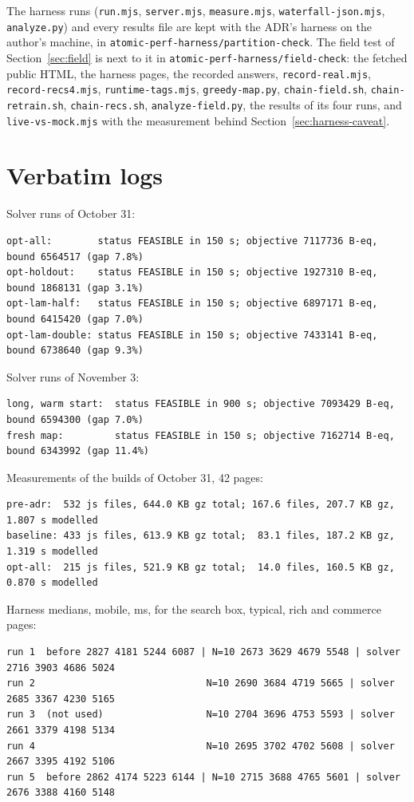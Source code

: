 \documentclass[11pt]{article}
\newcommand{\code}[1]{\texttt{#1}}
\begin{document}
\noindent The harness runs (\code{run.mjs}, \code{server.mjs}, \code{measure.mjs}, \code{waterfall-json.mjs}, \code{analyze.py}) and every results file are kept with the ADR's harness on the author's machine, in \code{atomic-perf-harness/partition-check}. The field test of Section~\ref{sec:field} is next to it in \code{atomic-perf-harness/field-check}: the fetched public HTML, the harness pages, the recorded answers, \code{record-real.mjs}, \code{record-recs4.mjs}, \code{runtime-tags.mjs}, \code{greedy-map.py}, \code{chain-field.sh}, \code{chain-retrain.sh}, \code{chain-recs.sh}, \code{analyze-field.py}, the results of its four runs, and \code{live-vs-mock.mjs} with the measurement behind Section~\ref{sec:harness-caveat}.

\section{Verbatim logs}\label{app:logs}
Solver runs of October 31:
\par{\footnotesize
\begin{verbatim}
opt-all:        status FEASIBLE in 150 s; objective 7117736 B-eq, bound 6564517 (gap 7.8%)
opt-holdout:    status FEASIBLE in 150 s; objective 1927310 B-eq, bound 1868131 (gap 3.1%)
opt-lam-half:   status FEASIBLE in 150 s; objective 6897171 B-eq, bound 6415420 (gap 7.0%)
opt-lam-double: status FEASIBLE in 150 s; objective 7433141 B-eq, bound 6738640 (gap 9.3%)
\end{verbatim}
}
\noindent Solver runs of November 3:
\par{\footnotesize
\begin{verbatim}
long, warm start:  status FEASIBLE in 900 s; objective 7093429 B-eq, bound 6594300 (gap 7.0%)
fresh map:         status FEASIBLE in 150 s; objective 7162714 B-eq, bound 6343992 (gap 11.4%)
\end{verbatim}
}
\noindent Measurements of the builds of October 31, 42 pages:
\par{\footnotesize
\begin{verbatim}
pre-adr:  532 js files, 644.0 KB gz total; 167.6 files, 207.7 KB gz, 1.807 s modelled
baseline: 433 js files, 613.9 KB gz total;  83.1 files, 187.2 KB gz, 1.319 s modelled
opt-all:  215 js files, 521.9 KB gz total;  14.0 files, 160.5 KB gz, 0.870 s modelled
\end{verbatim}
}
\noindent Harness medians, mobile, ms, for the search box, typical, rich and commerce pages:
\par{\footnotesize
\begin{verbatim}
run 1  before 2827 4181 5244 6087 | N=10 2673 3629 4679 5548 | solver 2716 3903 4686 5024
run 2                              N=10 2690 3684 4719 5665 | solver 2685 3367 4230 5165
run 3  (not used)                  N=10 2704 3696 4753 5593 | solver 2661 3379 4198 5134
run 4                              N=10 2695 3702 4702 5608 | solver 2667 3395 4192 5106
run 5  before 2862 4174 5223 6144 | N=10 2715 3688 4765 5601 | solver 2676 3388 4160 5148
\end{verbatim}
}
\end{document}
